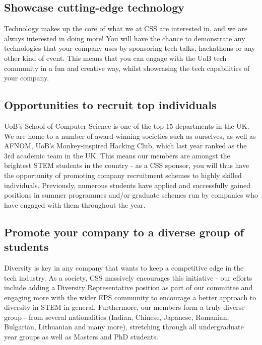 \documentclass{article}
\begin{document}
\subsection*{Showcase cutting-edge technology}

Technology makes up the core of what we at CSS are interested in, and we are always interested in doing more!
You will have the chance to demonstrate any technologies that your company uses by sponsoring tech talks, hackathons or any other kind of event.
This means that you can engage with the UoB tech community in a fun and creative way, whilst showcasing the tech capabilities of your company.

\newpage

\vspace{-1.5cm}

\subsection*{Opportunities to recruit top individuals}

UoB’s School of Computer Science is one of the top 15 departments in the UK. We are home to a number of award-winning societies such as ourselves, as well as AFNOM, UoB's Monkey-inspired Hacking Club, which last year ranked as the 3rd academic team in the UK.
This means our members are amongst the brightest STEM students in the country - as a CSS sponsor, you will thus have the opportunity of promoting company recruitment schemes to highly skilled individuals.
Previously, numerous students have applied and successfully gained positions in summer programmes and/or graduate schemes run by companies who have engaged with them throughout the year.

\vspace{-0.75cm}

\subsection*{Promote your company to a diverse group of students}

Diversity is key in any company that wants to keep a competitive edge in the tech industry. As a society, CSS massively encourages this initiative - our efforts include adding a Diversity Representative position as part of our committee and engaging more with the wider EPS community to encourage a better approach to diversity in STEM in general.
Furthermore, our members form a truly diverse group - from several nationalities (Indian, Chinese, Japanese, Romanian, Bulgarian, Lithuanian and many more), stretching through all undergraduate year groups as well as Masters and PhD students.
\end{document}
